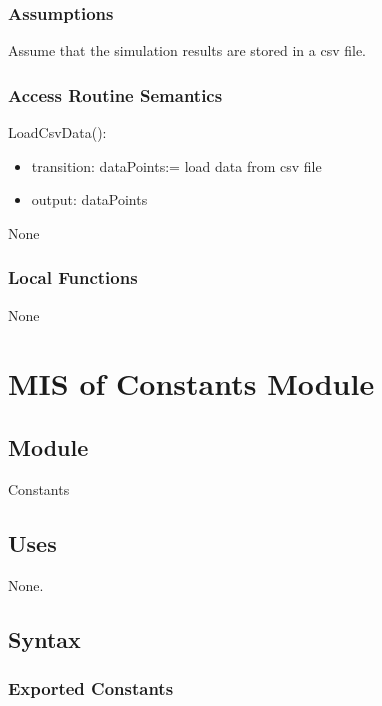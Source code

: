 \documentclass[12pt, titlepage]{article}
\begin{document}
\subsubsection{Assumptions}

Assume that the simulation results are stored in a csv file.

\subsubsection{Access Routine Semantics}

\noindent LoadCsvData():
\begin{itemize}
\item transition: dataPoints:= load data from csv file
\item output: dataPoints
\end{itemize}

None

\subsubsection{Local Functions}

None

\newpage

\section{MIS of Constants Module} \label{Module_constants} 
\subsection{Module}

Constants

\subsection{Uses}
None.

\subsection{Syntax}

\subsubsection{Exported Constants}
\end{document}
